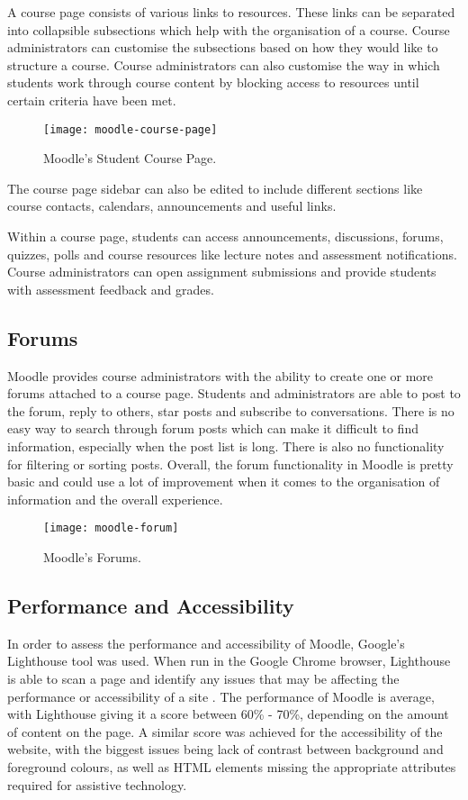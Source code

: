 A course page consists of various links to resources. These links can be separated into collapsible subsections which help with the organisation of a course.
Course administrators can customise the subsections based on how they would like to structure a course.
Course administrators can also customise the way in which students work through course content by blocking access to resources until certain criteria have been met.

\begin{figure}[h!]
    \centering
    \texttt{[image: moodle-course-page]}
    \caption{Moodle's Student Course Page.}
\end{figure}

The course page sidebar can also be edited to include different sections like course contacts, calendars, announcements and useful links.

Within a course page, students can access announcements, discussions, forums, quizzes, polls and course resources like lecture notes and assessment notifications.
Course administrators can open assignment submissions and provide students with assessment feedback and grades.

\subsection{Forums}

Moodle provides course administrators with the ability to create one or more forums attached to a course page.
Students and administrators are able to post to the forum, reply to others, star posts and subscribe to conversations.
There is no easy way to search through forum posts which can make it difficult to find information, especially when the post list is long.
There is also no functionality for filtering or sorting posts.
Overall, the forum functionality in Moodle is pretty basic and could use a lot of improvement when it comes to the organisation of information and the overall experience.

\begin{figure}[h!]
    \centering
    \texttt{[image: moodle-forum]}
    \caption{Moodle's Forums.}
\end{figure}

\subsection{Performance and Accessibility}
In order to assess the performance and accessibility of Moodle, Google's Lighthouse tool was used.
When run in the Google Chrome browser, Lighthouse is able to scan a page and identify any issues that may be affecting the performance or accessibility of a site \cite{googleLighthouse}.
The performance of Moodle is average, with Lighthouse giving it a score between 60\% - 70\%, depending on the amount of content on the page.
A similar score was achieved for the accessibility of the website, with the biggest issues being lack of contrast between background and foreground colours, as well as HTML elements missing the appropriate attributes required for assistive technology.

